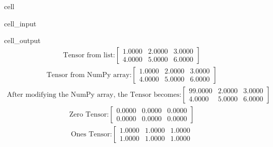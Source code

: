 \documentclass[letterpaper,10pt,english]{jupyterBook}
\begin{document}
\begin{sphinxuseclass}{cell}
\begin{sphinxVerbatimInput}
\begin{sphinxuseclass}{cell_input}
\end{sphinxuseclass}\end{sphinxVerbatimInput}
\begin{sphinxVerbatimOutput}

\begin{sphinxuseclass}{cell_output}\begin{equation*}
\begin{split}\displaystyle \text{Tensor from list:}\left[
\begin{array}{}
  1.0000 &  2.0000 &  3.0000\\
  4.0000 &  5.0000 &  6.0000
\end{array}
\right]\end{split}
\end{equation*}\begin{equation*}
\begin{split}\displaystyle \text{Tensor from NumPy array:}\left[
\begin{array}{}
  1.0000 &  2.0000 &  3.0000\\
  4.0000 &  5.0000 &  6.0000
\end{array}
\right]\end{split}
\end{equation*}\begin{equation*}
\begin{split}\displaystyle \text{After modifying the NumPy array, the Tensor becomes:}\left[
\begin{array}{}
  99.0000 &  2.0000 &  3.0000\\
  4.0000 &  5.0000 &  6.0000
\end{array}
\right]\end{split}
\end{equation*}\begin{equation*}
\begin{split}\displaystyle \text{Zero Tensor:}\left[
\begin{array}{}
  0.0000 &  0.0000 &  0.0000\\
  0.0000 &  0.0000 &  0.0000
\end{array}
\right]\end{split}
\end{equation*}\begin{equation*}
\begin{split}\displaystyle \text{Ones Tensor:}\left[
\begin{array}{}
  1.0000 &  1.0000 &  1.0000\\
  1.0000 &  1.0000 &  1.0000
\end{array}

\end{split}
\end{equation*}
\end{sphinxuseclass}
\end{sphinxVerbatimOutput}
\end{sphinxuseclass}
\end{document}
